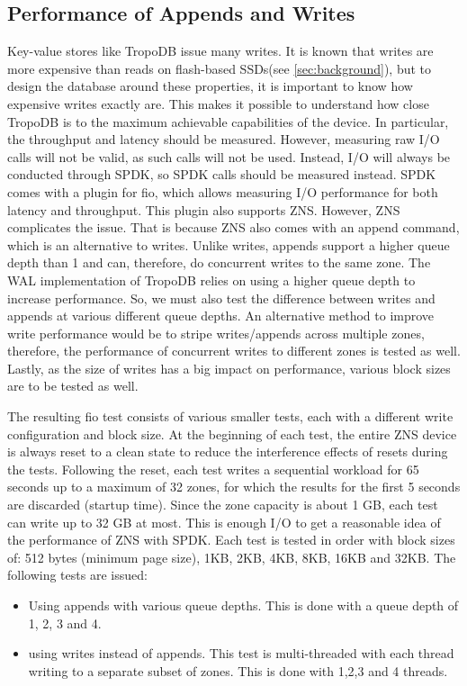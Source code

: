 \subsection{Performance of Appends and Writes}
\label{sec:appends}
Key-value stores like TropoDB issue many writes. It is known that writes are more expensive than reads on flash-based SSDs(see \autoref{sec:background}), but to design the database around these properties, it is important to know how expensive writes exactly are. This makes it possible to understand how close TropoDB is to the maximum achievable capabilities of the device. In particular, the throughput and latency should be measured. However, measuring raw I/O calls will not be valid, as such calls will not be used. Instead, I/O will always be conducted through SPDK, so SPDK calls should be measured instead. SPDK comes with a plugin for fio, which allows measuring I/O performance for both latency and throughput. This plugin also supports ZNS. However, ZNS complicates the issue. That is because ZNS also comes with an append command, which is an alternative to writes. Unlike writes, appends support a higher queue depth than 1 and can, therefore, do concurrent writes to the same zone. The WAL implementation of TropoDB relies on using a higher queue depth to increase performance. So, we must also test the difference between writes and appends at various different queue depths. An alternative method to improve write performance would be to stripe writes/appends across multiple zones, therefore, the performance of concurrent writes to different zones is tested as well. Lastly, as the size of writes has a big impact on performance, various block sizes are to be tested as well.

The resulting fio test consists of various smaller tests, each with a different write configuration and block size. At the beginning of each test, the entire ZNS device is always reset to a clean state to reduce the interference effects of resets during the tests. Following the reset, each test writes a sequential workload for 65 seconds up to a maximum of 32 zones, for which the results for the first 5 seconds are discarded (startup time). Since the zone capacity is about 1 GB, each test can write up to 32 GB at most. This is enough I/O to get a reasonable idea of the performance of ZNS with SPDK. Each test is tested in order with block sizes of: 512 bytes (minimum page size), 1KB, 2KB, 4KB, 8KB, 16KB and 32KB. The following tests are issued:
\begin{itemize}
    \item Using appends with various queue depths. This is done with a queue depth of 1, 2, 3 and 4.
    \item using writes instead of appends. This test is multi-threaded with each thread writing to a separate subset of zones. This is done with 1,2,3 and 4 threads. 
\end{itemize}

